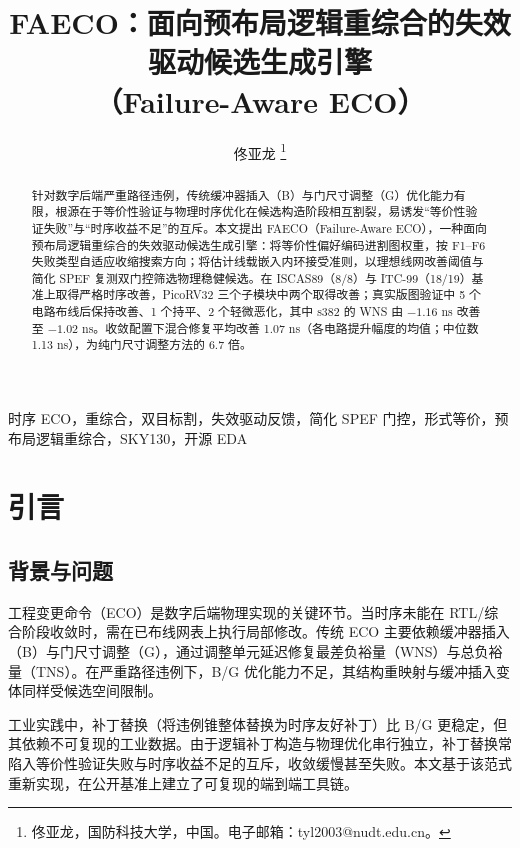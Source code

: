 \documentclass[journal]{IEEEtran}
\title{FAECO：面向预布局逻辑重综合的失效驱动候选生成引擎\\
（Failure-Aware ECO）}
\author{佟亚龙%
\thanks{佟亚龙，国防科技大学，中国。电子邮箱：tyl2003@nudt.edu.cn。}}
\begin{document}
\maketitle

\sloppy

\begin{abstract}
针对数字后端严重路径违例，传统缓冲器插入（B）与门尺寸调整（G）优化能力有限，根源在于等价性验证与物理时序优化在候选构造阶段相互割裂，易诱发“等价性验证失败”与“时序收益不足”的互斥。本文提出 FAECO（Failure-Aware ECO），一种面向预布局逻辑重综合的失效驱动候选生成引擎：将等价性偏好编码进割图权重，按 F1--F6 失败类型自适应收缩搜索方向；将估计线载嵌入内环接受准则，以理想线网改善阈值与简化 SPEF 复测双门控筛选物理稳健候选。在 ISCAS89（8/8）与 ITC-99（18/19）基准上取得严格时序改善，PicoRV32 三个子模块中两个取得改善；真实版图验证中 5 个电路布线后保持改善、1 个持平、2 个轻微恶化，其中 s382 的 WNS 由 $-1.16$ ns 改善至 $-1.02$ ns。收敛配置下混合修复平均改善 1.07 ns（各电路提升幅度的均值；中位数 1.13 ns），为纯门尺寸调整方法的 6.7 倍。
\end{abstract}

\begin{IEEEkeywords}
时序 ECO，重综合，双目标割，失效驱动反馈，简化 SPEF 门控，形式等价，预布局逻辑重综合，SKY130，开源 EDA
\end{IEEEkeywords}

\section{引言}

\subsection{背景与问题}

工程变更命令（ECO）是数字后端物理实现的关键环节。当时序未能在 RTL/综合阶段收敛时，需在已布线网表上执行局部修改。传统 ECO 主要依赖缓冲器插入（B）与门尺寸调整（G），通过调整单元延迟修复最差负裕量（WNS）与总负裕量（TNS）。在严重路径违例下，B/G 优化能力不足，其结构重映射与缓冲插入变体同样受候选空间限制\cite{chen2012metal,chen2012fixability,liang2012buffer,ho2010eco}。

工业实践中，补丁替换（将违例锥整体替换为时序友好补丁）比 B/G 更稳定，但其依赖不可复现的工业数据。由于逻辑补丁构造与物理优化串行独立，补丁替换常陷入等价性验证失败与时序收益不足的互斥，收敛缓慢甚至失败。本文基于该范式重新实现，在公开基准上建立了可复现的端到端工具链。
\end{document}
